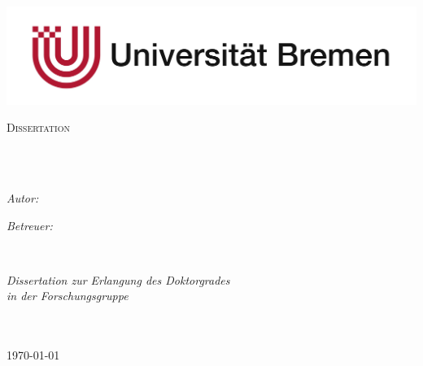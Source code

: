 \documentclass[11pt,english,singlespacing,headsepline]{MastersDoctoralThesis}
\author{Kai Michael \textsc{Renken}} %
\begin{document}
\frontmatter %

\pagestyle{plain} %


\begin{titlepage}
\begin{center}

\includegraphics[scale=0.3]{Logo.jpg} %

\textsc{\Large Dissertation}\\[0.5cm] %

\HRule \\[0.4cm] %
{\huge \bfseries \ttitle\par}\vspace{0.4cm} %
\HRule \\[1.5cm] %
 
\begin{minipage}[t]{0.4\textwidth}
\begin{flushleft} \large
\emph{Autor:}\\
{\authorname} %
\end{flushleft}
\end{minipage}
\begin{minipage}[t]{0.4\textwidth}
\begin{flushright} \large
\emph{Betreuer:} \\
{\supname} %
\end{flushright}
\end{minipage}\\[3cm]
 
\vfill

\large \textit{Dissertation zur Erlangung des Doktorgrades \degreename}\\[0.3cm] %
\textit{in der Forschungsgruppe}\\[0.4cm]
\groupname\\\deptname\\[2cm] %
 
\vfill

{\large \myformat\today}\\[4cm] %
 
\vfill
\end{center}
\end{titlepage}
\end{document}
